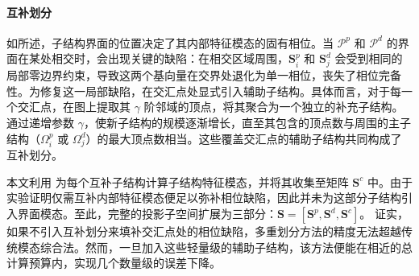\paragraph{互补划分}
如所述，子结构界面的位置决定了其内部特征模态的固有相位。当 $\mathcal{P}^p$ 和 $\mathcal{P}^d$ 的界面在某处相交时，会出现关键的缺陷：在相交区域周围，$\mathbf{S}_i^p$ 和 $\mathbf{S}^d_j$ 会受到相同的局部零边界约束，导致这两个基向量在交界处退化为单一相位，丧失了相位完备性。为修复这一局部缺陷，在交汇点处显式引入辅助子结构。具体而言，对于每一个交汇点，在图上提取其 $\gamma$ 阶邻域的顶点，将其聚合为一个独立的补充子结构。通过递增参数 $\gamma$，使新子结构的规模逐渐增长，直至其包含的顶点数与周围的主子结构（$\Omega_i^p$ 或 $\Omega_j^d$）的最大顶点数相当。这些覆盖交汇点的辅助子结构共同构成了互补划分。

本文利用 为每个互补子结构计算子结构特征模态，并将其收集至矩阵 $\mathbf{S}^c$ 中。由于实验证明仅需互补内部特征模态便足以弥补相位缺陷，因此并未为这部分子结构引入界面模态。至此，完整的投影子空间扩展为三部分：$\mathbf{S} = [\mathbf{S}^p, \mathbf{S}^d, \mathbf{S}^c]$。
 证实，如果不引入互补划分来填补交汇点处的相位缺陷，多重划分方法的精度无法超越传统模态综合法。然而，一旦加入这些轻量级的辅助子结构，该方法便能在相近的总计算预算内，实现几个数量级的误差下降。
